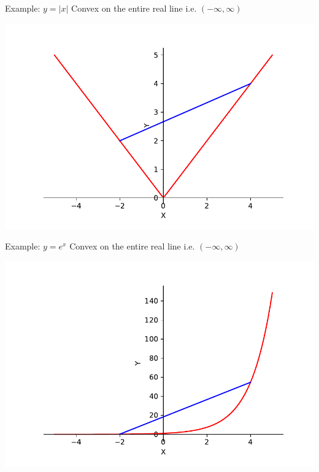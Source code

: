 \documentclass{beamer}
\begin{document}
	\begin{frame}{Example: $y = |x|$}
	Convex on the entire real line i.e. $(-\infty, \infty)$
	\begin{center}
	\includegraphics[scale=0.5]{y-absx}
	\end{center}
	\end{frame}

	\begin{frame}{Example: $y = e^x$}
	Convex on the entire real line i.e. $(-\infty, \infty)$
	\begin{center}
	\includegraphics[scale=0.5]{y-ex}
	\end{center}
	\end{frame}
\end{document}
